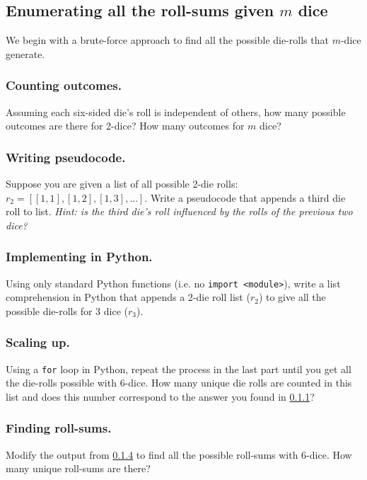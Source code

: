 \documentclass[11pt, oneside]{article}   	%
\begin{document}
\subsection{Enumerating all the roll-sums given $m$ dice}
We begin with a brute-force approach to find all the possible die-rolls that $m$-dice generate. 

\subsubsection{Counting outcomes.} \label{sssec:dice_count_cases}
Assuming each six-sided die's roll is independent of others, how many possible outcomes are there for 2-dice? How many outcomes for $m$ dice?

\subsubsection{Writing pseudocode.}
Suppose you are given a list of all possible 2-die rolls: $r_2 = [[1,1], [1,2], [1,3], \ldots]$. Write a pseudocode that appends a third die roll to list. {\it Hint: is the third die's roll influenced by the rolls of the previous two dice?}

\subsubsection{Implementing in Python.}
Using only standard Python functions (i.e. no {\tt import <module>}), write a list comprehension in Python that appends a 2-die roll list ($r_2$) to give all the possible die-rolls for 3 dice ($r_3$).

\subsubsection{Scaling up.} \label{sssec:dice_scaling_up1}
Using a {\tt for} loop in Python, repeat the process in the last part until you get all the die-rolls possible with 6-dice. How many unique die rolls are counted in this list and does this number correspond to the answer you found in \ref{sssec:dice_count_cases}?

\subsubsection{Finding roll-sums.} \label{sssec:dice_summing_outcomes}
Modify the output from \ref{sssec:dice_scaling_up1} to find all the possible roll-sums with 6-dice. How many unique roll-sums are there?
\end{document}
